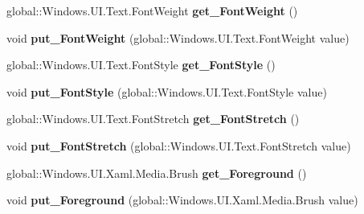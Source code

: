 \begin{DoxyCompactItemize}
global\+::\+Windows.\+U\+I.\+Text.\+Font\+Weight {\bfseries get\+\_\+\+Font\+Weight} ()
\item 
\mbox{\label{interface_windows_1_1_u_i_1_1_xaml_1_1_controls_1_1_i_control_a50f45e373b66a5b092b6464b5dbd94bf}} 
void {\bfseries put\+\_\+\+Font\+Weight} (global\+::\+Windows.\+U\+I.\+Text.\+Font\+Weight value)
\item 
\mbox{\label{interface_windows_1_1_u_i_1_1_xaml_1_1_controls_1_1_i_control_a3e1d85a4f0fe3ee8c4cff3ce4f34a651}} 
global\+::\+Windows.\+U\+I.\+Text.\+Font\+Style {\bfseries get\+\_\+\+Font\+Style} ()
\item 
\mbox{\label{interface_windows_1_1_u_i_1_1_xaml_1_1_controls_1_1_i_control_ae53a72ae88bd4e1f7d417580689134f9}} 
void {\bfseries put\+\_\+\+Font\+Style} (global\+::\+Windows.\+U\+I.\+Text.\+Font\+Style value)
\item 
\mbox{\label{interface_windows_1_1_u_i_1_1_xaml_1_1_controls_1_1_i_control_a228e9d117d9f71834ef119f7e646e5ac}} 
global\+::\+Windows.\+U\+I.\+Text.\+Font\+Stretch {\bfseries get\+\_\+\+Font\+Stretch} ()
\item 
\mbox{\label{interface_windows_1_1_u_i_1_1_xaml_1_1_controls_1_1_i_control_ad35a998ea47ff36b5d343fadbc164608}} 
void {\bfseries put\+\_\+\+Font\+Stretch} (global\+::\+Windows.\+U\+I.\+Text.\+Font\+Stretch value)
\item 
\mbox{\label{interface_windows_1_1_u_i_1_1_xaml_1_1_controls_1_1_i_control_a47d44a65491cf9594c0e06bb0f5f2d81}} 
global\+::\+Windows.\+U\+I.\+Xaml.\+Media.\+Brush {\bfseries get\+\_\+\+Foreground} ()
\item 
\mbox{\label{interface_windows_1_1_u_i_1_1_xaml_1_1_controls_1_1_i_control_a6a0ed2bdfead49d6dd9e637cc2a53e1a}} 
void {\bfseries put\+\_\+\+Foreground} (global\+::\+Windows.\+U\+I.\+Xaml.\+Media.\+Brush value)

\end{DoxyCompactItemize}
